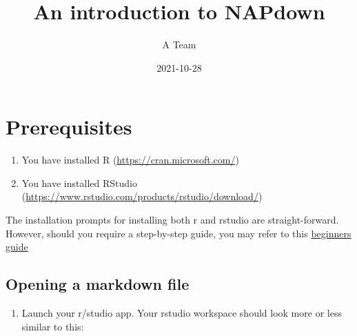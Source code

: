 \documentclass[
]{book}
\title{An introduction to NAPdown}
\author{A Team}
\date{2021-10-28}
\providecommand{\tightlist}{%
  \setlength{\itemsep}{0pt}\setlength{\parskip}{0pt}}
\begin{document}
\maketitle

{
\setcounter{tocdepth}{1}
\tableofcontents
}
\hypertarget{prerequisites}{%
\chapter{Prerequisites}\label{prerequisites}}

\begin{enumerate}
\def\labelenumi{\arabic{enumi}.}
\tightlist
\item
  You have installed R (\url{https://cran.microsoft.com/})
\item
  You have installed RStudio (\url{https://www.rstudio.com/products/rstudio/download/})
\end{enumerate}

The installation prompts for installing both r and rstudio are straight-forward.
However, should you require a step-by-step guide, you may refer to this \href{https://techvidvan.com/tutorials/install-r/}{beginners guide}

\hypertarget{opening-a-markdown-file}{%
\section{Opening a markdown file}\label{opening-a-markdown-file}}

\begin{enumerate}
\def\labelenumi{\arabic{enumi}.}
\tightlist
\item
  Launch your r/studio app.
  Your rstudio workspace should look more or less similar to this:
\end{enumerate}
\end{document}

